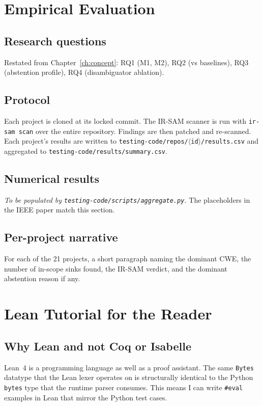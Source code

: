 \documentclass[a4paper,11pt]{report}
\begin{document}
\chapter{Empirical Evaluation}\label{ch:eval}
\section{Research questions}
Restated from Chapter~\ref{ch:concept}: RQ1 (M1, M2), RQ2 (vs baselines), RQ3 (abstention profile), RQ4 (disambiguator ablation).

\section{Protocol}
Each project is cloned at its locked commit. The IR-SAM scanner is run with \texttt{ir-sam scan} over the entire repository. Findings are then patched and re-scanned. Each project's results are written to \texttt{testing-code/repos/$\langle$id$\rangle$/results.csv} and aggregated to \texttt{testing-code/results/summary.csv}.

\section{Numerical results}
\textit{To be populated by \texttt{testing-code/scripts/aggregate.py}.} The placeholders in the IEEE paper match this section.

\section{Per-project narrative}
For each of the 21 projects, a short paragraph naming the dominant CWE, the number of in-scope sinks found, the IR-SAM verdict, and the dominant abstention reason if any.

\chapter{Lean Tutorial for the Reader}\label{ch:lean}
\section{Why Lean and not Coq or Isabelle}
Lean~4 is a programming language as well as a proof assistant. The same \texttt{Bytes} datatype that the Lean lexer operates on is structurally identical to the Python \texttt{bytes} type that the runtime parser consumes. This means I can write \texttt{#eval} examples in Lean that mirror the Python test cases.
\end{document}
